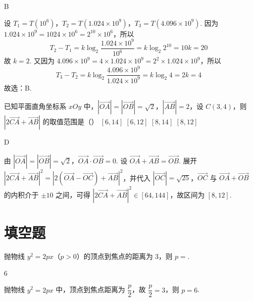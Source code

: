 \documentclass[UTF8,a4paper,oneside,11pt]{ctexbook}
\begin{document}
\begin{answer}
B
\end{answer}

\begin{solution}
设 \(T_1=T(10^6)\)，\(T_2=T(1.024\times10^9)\)，\(T_3=T(4.096\times10^9)\). 因为 \(1.024\times10^9=1024\times10^6=2^{10}\times10^6\)，所以
\[
T_2-T_1=k\log_2 \frac{1.024\times10^9}{10^6}=k\log_2 2^{10}=10k=20
\]
故 \(k=2\). 又因为 \(4.096\times10^9=4\times1.024\times10^9=2^2\times1.024\times10^9\)，所以
\[
T_3-T_2=k\log_2 \frac{4.096\times10^9}{1.024\times10^9}=k\log_2 4=2k=4
\]
故选：B.
\end{solution}

\begin{problem}
已知平面直角坐标系 \(xOy\) 中，\(|\overrightarrow{OA}|=|\overrightarrow{OB}|=\sqrt2\)，\(|\overrightarrow{AB}|=2\)，设 \(C(3,4)\)，则 \(|2\overrightarrow{CA}+\overrightarrow{AB}|\) 的取值范围是（\quad）
\choices
    {\([6,14]\)}
    {\([6,12]\)}
    {\([8,14]\)}
    {\([8,12]\)}
\end{problem}

\begin{answer}
D
\end{answer}

\begin{solution}
由 \(|\overrightarrow{OA}|=|\overrightarrow{OB}|=\sqrt2\)，\(\overrightarrow{OA}\cdot\overrightarrow{OB}=0\). 设 \(\overrightarrow{OA}+\overrightarrow{AB}=\overrightarrow{OB}\). 展开 \(|2\overrightarrow{CA}+\overrightarrow{AB}|^2 =|2(\overrightarrow{OA}-\overrightarrow{OC})+\overrightarrow{AB}|^2\)，并代入 \(|\overrightarrow{OC}|=\sqrt{25}\)，\(\overrightarrow{OC}\) 与 \(\overrightarrow{OA}+\overrightarrow{OB}\) 的内积介于 \(\pm10\) 之间，可得 \(|2\overrightarrow{CA}+\overrightarrow{AB}|^2\in[64,144]\)，故区间为 \([8,12]\).
\end{solution}
\section{填空题}

\begin{problem}
抛物线 \(y^2=2px\)（\(p>0\)）的顶点到焦点的距离为 3，则 \(p=\)\fillinblank{}.
\end{problem}

\begin{answer}
6
\end{answer}

\begin{solution}
抛物线 \(y^2=2px\) 中，顶点到焦点距离为 \(\dfrac p2\)，故 \(\dfrac p2=3\)，则 \(p=6\).
\end{solution}
\end{document}
